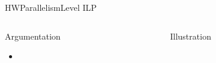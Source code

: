 %
\begin{Frame}{HWParallelismLevel ILP}
  \begin{columns}[t]
    \begin{column}{5cm} %
      \begin{block}{Argumentation}
        \begin{itemize}
        \item 
        \end{itemize}
      \end{block} 
    \end{column}
    
    \begin{column}{5cm} %
      \begin{block}{Illustration}
      \end{block}   
    \end{column}
  \end{columns}  
\end{Frame}


